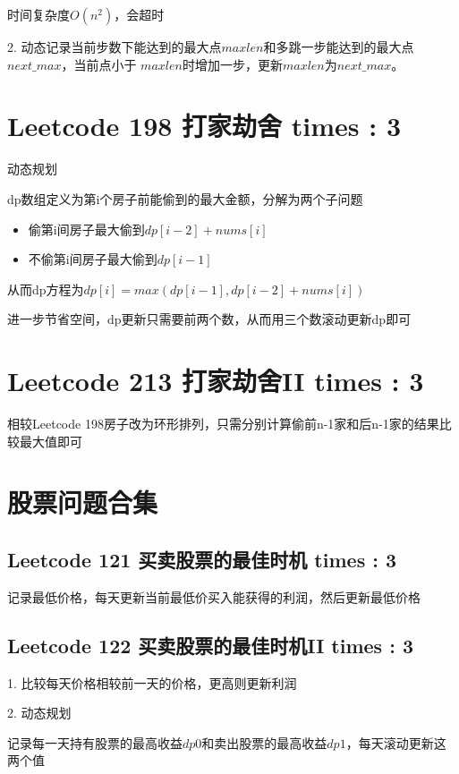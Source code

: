 \documentclass[UTF8]{ctexart}
\begin{document}
时间复杂度$O(n^2)$，会超时

2. 动态记录当前步数下能达到的最大点$maxlen$和多跳一步能达到的最大点$next\_max$，当前点小于
$maxlen$时增加一步，更新$maxlen$为$next\_max$。


\section{Leetcode 198 打家劫舍 times : 3}
动态规划

dp数组定义为第i个房子前能偷到的最大金额，分解为两个子问题
\begin{itemize}
	\item 偷第i间房子最大偷到$dp[i - 2] + nums[i]$
	\item 不偷第i间房子最大偷到$dp[i - 1]$
\end{itemize}
从而dp方程为$dp[i] = max(dp[i - 1], dp[i - 2] + nums[i])$

进一步节省空间，dp更新只需要前两个数，从而用三个数滚动更新dp即可

\section{Leetcode 213 打家劫舍II times : 3}
相较Leetcode 198房子改为环形排列，只需分别计算偷前n-1家和后n-1家的结果比较最大值即可

\section{股票问题合集}

\subsection{Leetcode 121 买卖股票的最佳时机 times : 3}
记录最低价格，每天更新当前最低价买入能获得的利润，然后更新最低价格

\subsection{Leetcode 122 买卖股票的最佳时机II times : 3}
1. 比较每天价格相较前一天的价格，更高则更新利润

2. 动态规划

记录每一天持有股票的最高收益$dp0$和卖出股票的最高收益$dp1$，每天滚动更新这两个值
\end{document}
